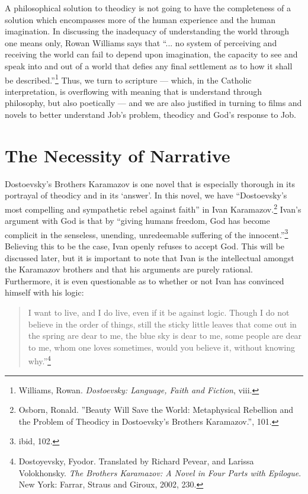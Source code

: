 A philosophical solution to theodicy is not going to have the completeness of a solution which encompasses more of the human experience and the human imagination. In discussing the inadequacy of understanding the world through one means only, Rowan Williams says that ``... no system of perceiving and receiving the world can fail to depend upon imagination, the capacity to see and speak into and out of a world that defies any final settlement as to how it shall be described.''\footnote{Williams, Rowan. \emph{Dostoevsky: Language, Faith and Fiction}, viii.} Thus, we turn to scripture --- which, in the Catholic interpretation, is overflowing with meaning that is understand through philosophy, but also poetically --- and we are also justified in turning to films and novels to better understand Job's problem, theodicy and God's response to Job.

\section{The Necessity of Narrative}
Dostoevsky's Brothers Karamazov is one novel that is especially thorough in its portrayal of theodicy and in its `answer'. In this novel, we have ``Dostoevsky's most compelling and sympathetic rebel against faith'' in Ivan Karamazov.\footnote{Osborn, Ronald. ''Beauty Will Save the World: Metaphysical Rebellion and the Problem of Theodicy in Dostoevsky's Brothers Karamazov.'', 101.} Ivan's argument with God is that by ``giving humans freedom, God has become complicit in the senseless, unending, unredeemable suffering of the innocent.''\footnote{ibid, 102.} Believing this to be the case, Ivan openly refuses to accept God. This will be discussed later, but it is important to note that Ivan is the intellectual amongst the Karamazov brothers and that his arguments are purely rational. Furthermore, it is even questionable as to whether or not Ivan has convinced himself with his logic: 

\begin{quote}
I want to live, and I do live, even if it be against logic. Though I do not believe in the order of things, still the sticky little leaves that come out in the spring are dear to me, the blue sky is dear to me, some people are dear to me, whom one loves sometimes, would you believe it, without knowing why.''\footnote{Dostoyevsky, Fyodor. Translated by Richard Pevear, and Larissa Volokhonsky. \emph{The Brothers Karamazov: A Novel in Four Parts with Epilogue}. New York: Farrar, Straus and Giroux, 2002, 230.}
\end{quote}

